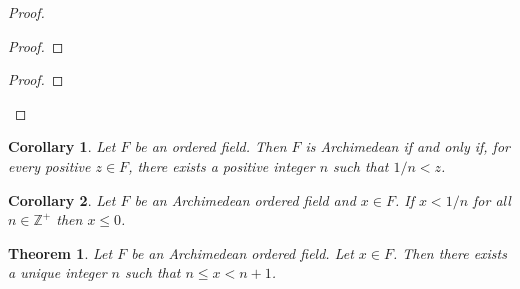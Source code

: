 \documentclass{article}
\let\qed\relax
\newtheorem{theorem}[axiom]{Theorem}
\newtheorem{corollary}{Corollary}[axiom]
\theoremstyle{definition}
\begin{document}
    \begin{proof}
        \pf
        \begin{proof}
        \end{proof}
        \begin{proof}
        \end{proof}
        \qed
    \end{proof}

    \begin{corollary}
        Let $F$ be an ordered field. Then $F$ is Archimedean if and only if, for every positive $z \in F$,
        there exists a positive integer $n$ such that $1/n < z$.
    \end{corollary}

    \begin{corollary}
        \label{cor:under_one_over_n}
        Let $F$ be an Archimedean ordered field and $x \in F$. If $x < 1/n$ for all $n \in \mathbb{Z}^+$
        then $x \leq 0$.
    \end{corollary}

    \begin{theorem}
        Let $F$ be an Archimedean ordered field. Let $x \in F$. Then there exists a unique integer $n$
        such that $n \leq x < n + 1$.
    \end{theorem}
\end{document}

